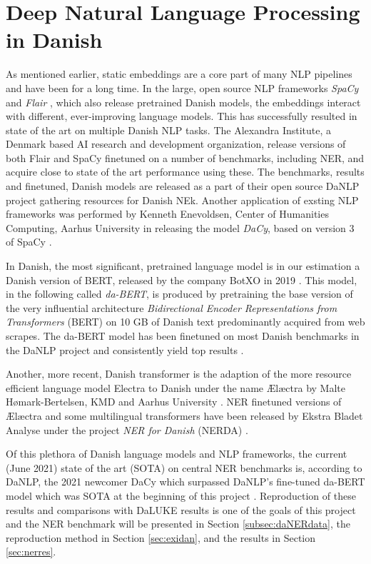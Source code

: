 \documentclass[main.tex]{subfiles}
\begin{document}
\section{Deep Natural Language Processing in Danish}
\label{sec:nlpda}
As mentioned earlier, static embeddings are a core part of many NLP pipelines and have been for a long time.
In the large, open source NLP frameworks \emph{SpaCy} \cite{honnibal2020spacy} and \emph{Flair} \cite{akbik2019flair}, which also release pretrained Danish models, the embeddings interact with different, ever-improving language models.
This has successfully resulted in state of the art on multiple Danish NLP tasks.
The Alexandra Institute, a Denmark based AI research and development organization, release versions of both Flair and SpaCy finetuned on a number of benchmarks, including NER, and acquire close to state of the art performance using these.
The benchmarks, results and finetuned, Danish models are released as a part of their open source DaNLP project gathering resources for Danish NEk\cite{danlp2021}.
Another application of exsting NLP frameworks was performed by Kenneth Enevoldsen, Center of Humanities Computing, Aarhus University in releasing the model \emph{DaCy}, based on version 3 of SpaCy \cite{enevoldsen2020dacy}.

In Danish, the most significant, pretrained language model is in our estimation a Danish version of BERT, released by the company BotXO in 2019 \cite{botxo2019dabert} .
This model, in the following called \emph{da-BERT}, is produced by pretraining the base version of the very influential architecture \emph{Bidirectional Encoder Representations from Transformers} (BERT) \cite{devlin2019bert} on 10 GB of Danish text predominantly acquired from web scrapes.
The da-BERT model has been finetuned on most Danish benchmarks in the DaNLP project and consistently yield top results \cite{danlp2021, hvingelby2020dane}.

Another, more recent, Danish transformer is the adaption of the more resource efficient language model Electra to Danish under the name Ælæctra by Malte Hømark-Bertelsen, KMD and Aarhus University \cite{bertelsen2020lctra}.
NER finetuned versions of Ælæctra and some multilingual transformers have been released by Ekstra Bladet Analyse under the project \emph{NER for Danish} (NERDA) \cite{kjeldgaard2020nerda}.

Of this plethora of Danish language models and NLP frameworks, the current (June 2021) state of the art (SOTA) on central NER benchmarks is, according to DaNLP, the 2021 newcomer DaCy which surpassed DaNLP's fine-tuned da-BERT model which was SOTA at the beginning of this project \footnotemark.
Reproduction of these results and comparisons with DaLUKE results is one of the goals of this project and the NER benchmark will be presented in Section \ref{subsec:daNERdata}, the reproduction method in Section \ref{sec:exidan}, and the results in Section \ref{sec:nerres}.
\end{document}
